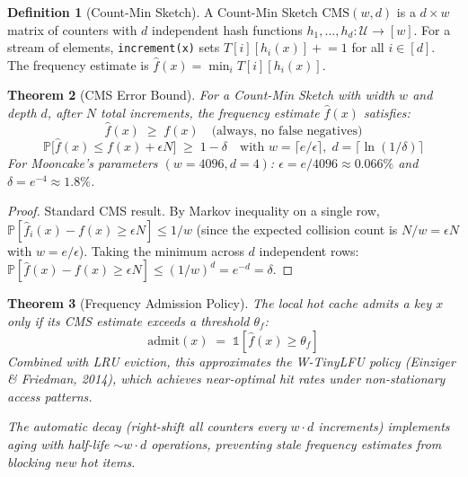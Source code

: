 \documentclass[11pt,a4paper,twoside]{article}
\theoremstyle{plain}
\newtheorem{theorem}{Theorem}[section]
\theoremstyle{definition}
\newtheorem{definition}[theorem]{Definition}
\theoremstyle{remark}
\newcommand{\Prob}{\mathbb{P}}
\newcommand{\Ind}{\mathbb{1}}
\begin{document}
\begin{definition}[Count-Min Sketch]
\label{def:cms}
A Count-Min Sketch $\text{CMS}(w, d)$ is a $d \times w$ matrix of counters with
$d$ independent hash functions $h_1, \ldots, h_d : \mathcal{U} \to [w]$.
For a stream of elements, \texttt{increment(x)} sets
$T[i][h_i(x)] \mathrel{+}= 1$ for all $i \in [d]$.
The frequency estimate is $\hat{f}(x) = \min_i T[i][h_i(x)]$.
\end{definition}

\begin{theorem}[CMS Error Bound]
\label{thm:cms-error}
For a Count-Min Sketch with width $w$ and depth $d$, after $N$ total increments,
the frequency estimate $\hat{f}(x)$ satisfies:
\begin{equation}
  \hat{f}(x) \;\geq\; f(x) \quad\text{(always, no false negatives)}
\end{equation}
\begin{equation}
  \Prob\bigl[\hat{f}(x) \leq f(x) + \epsilon N\bigr] \;\geq\; 1 - \delta
  \quad\text{with } w = \lceil e/\epsilon \rceil,\; d = \lceil \ln(1/\delta) \rceil
\end{equation}
For Mooncake's parameters $(w=4096, d=4)$:
$\epsilon = e/4096 \approx 0.066\%$ and $\delta = e^{-4} \approx 1.8\%$.
\end{theorem}

\begin{proof}
Standard CMS result. By Markov inequality on a single row, $\Prob[\hat{f}_i(x) - f(x)
\geq \epsilon N] \leq 1/w$ (since the expected collision count is $N/w = \epsilon N$
with $w = e/\epsilon$). Taking the minimum across $d$ independent rows:
$\Prob[\hat{f}(x) - f(x) \geq \epsilon N] \leq (1/w)^d = e^{-d} = \delta$.
\end{proof}

\begin{theorem}[Frequency Admission Policy]
\label{thm:freq-admission}
The local hot cache admits a key $x$ only if its CMS estimate exceeds a threshold
$\theta_f$:
\begin{equation}
  \text{admit}(x) \;=\; \Ind[\hat{f}(x) \geq \theta_f]
\end{equation}
Combined with LRU eviction, this approximates the W-TinyLFU policy
(Einziger \& Friedman, 2014), which achieves near-optimal hit rates under
non-stationary access patterns.

The automatic decay (right-shift all counters every $w \cdot d$ increments) implements
aging with half-life $\sim w \cdot d$ operations, preventing stale frequency estimates
from blocking new hot items.
\end{theorem}
\end{document}
